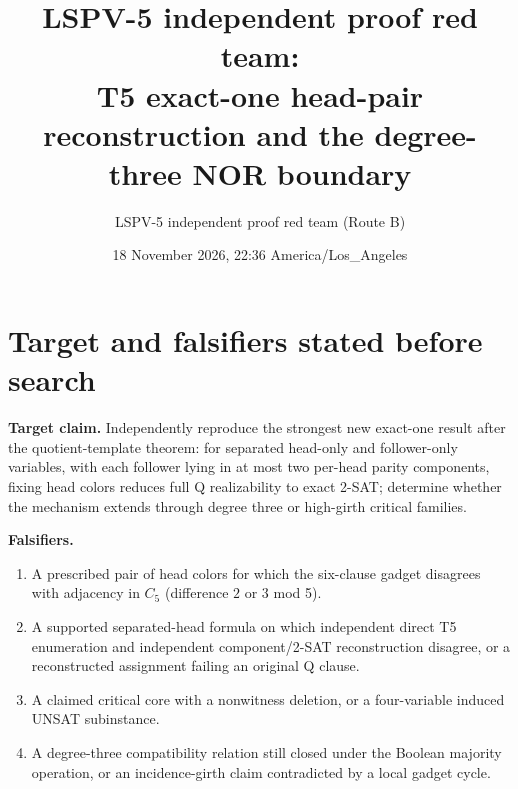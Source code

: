 \documentclass[11pt]{article}
\title{LSPV-5 independent proof red team:\\T5 exact-one head-pair reconstruction and the degree-three NOR boundary}
\author{LSPV-5 independent proof red team (Route B)}
\date{18 November 2026, 22:36 America/Los\_Angeles}
\begin{document}
\maketitle

\begin{center}
\end{center}

\section{Target and falsifiers stated before search}
\textbf{Target claim.}  Independently reproduce the strongest new exact-one result after the quotient-template theorem: for separated head-only and follower-only variables, with each follower lying in at most two per-head parity components, fixing head colors reduces full Q realizability to exact 2-SAT; determine whether the mechanism extends through degree three or high-girth critical families.

\textbf{Falsifiers.}
\begin{enumerate}
\item A prescribed pair of head colors for which the six-clause gadget disagrees with adjacency in $C_5$ (difference $2$ or $3$ mod 5).
\item A supported separated-head formula on which independent direct T5 enumeration and independent component/2-SAT reconstruction disagree, or a reconstructed assignment failing an original Q clause.
\item A claimed critical core with a nonwitness deletion, or a four-variable induced UNSAT subinstance.
\item A degree-three compatibility relation still closed under the Boolean majority operation, or an incidence-girth claim contradicted by a local gadget cycle.
\end{enumerate}
\end{document}
